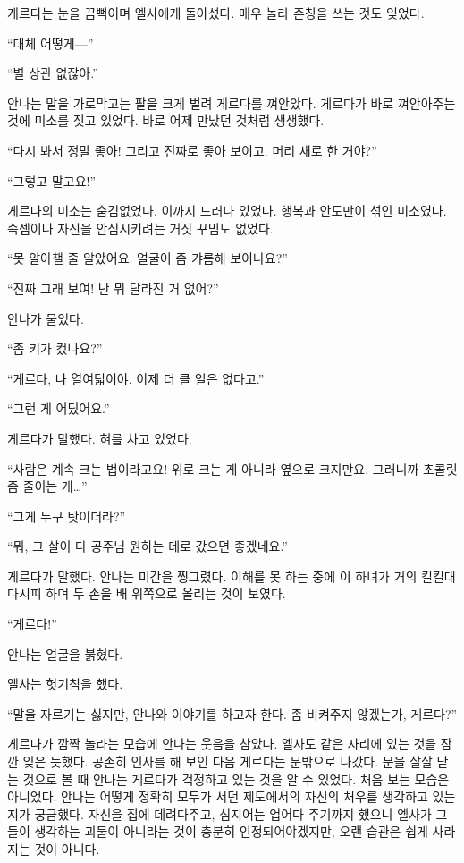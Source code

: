 게르다는 눈을 끔뻑이며 엘사에게 돌아섰다. 매우 놀라 존칭을 쓰는 것도 잊었다.

``대체 어떻게—''

``별 상관 없잖아.''

안나는 말을 가로막고는 팔을 크게 벌려 게르다를 껴안았다. 게르다가 바로 껴안아주는 것에 미소를 짓고 있었다. 바로 어제 만났던 것처럼 생생했다.

``다시 봐서 정말 좋아! 그리고 진짜로 좋아 보이고. 머리 새로 한 거야?''

``그렇고 말고요!''

게르다의 미소는 숨김없었다. 이까지 드러나 있었다. 행복과 안도만이 섞인 미소였다. 속셈이나 자신을 안심시키려는 거짓 꾸밈도 없었다.

``못 알아챌 줄 알았어요. 얼굴이 좀 갸름해 보이나요?''

``진짜 그래 보여! 난 뭐 달라진 거 없어?''

안나가 물었다.

``좀 키가 컸나요?''

``게르다, 나 열여덟이야. 이제 더 클 일은 없다고.''

``그런 게 어딨어요.''

게르다가 말했다. 혀를 차고 있었다.

``사람은 계속 크는 법이라고요! 위로 크는 게 아니라 옆으로 크지만요. 그러니까 초콜릿 좀 줄이는 게\ldots''

``그게 누구 탓이더라?''

``뭐, 그 살이 다 공주님 원하는 데로 갔으면 좋겠네요.''

게르다가 말했다. 안나는 미간을 찡그렸다. 이해를 못 하는 중에 이 하녀가 거의 킬킬대다시피 하며 두 손을 배 위쪽으로 올리는 것이 보였다.

``게르다!''

안나는 얼굴을 붉혔다.

엘사는 헛기침을 했다.

``말을 자르기는 싫지만, 안나와 이야기를 하고자 한다. 좀 비켜주지 않겠는가, 게르다?''

게르다가 깜짝 놀라는 모습에 안나는 웃음을 참았다. 엘사도 같은 자리에 있는 것을 잠깐 잊은 듯했다. 공손히 인사를 해 보인 다음 게르다는 문밖으로 나갔다. 문을 살살 닫는 것으로 볼 때 안나는 게르다가 걱정하고 있는 것을 알 수 있었다. 처음 보는 모습은 아니었다. 안나는 어떻게 정확히 모두가 서던 제도에서의 자신의 처우를 생각하고 있는지가 궁금했다. 자신을 집에 데려다주고, 심지어는 업어다 주기까지 했으니 엘사가 그들이 생각하는 괴물이 아니라는 것이 충분히 인정되어야겠지만, 오랜 습관은 쉽게 사라지는 것이 아니다.


